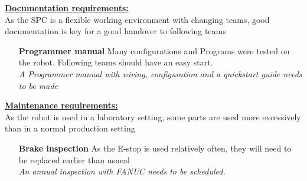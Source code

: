 %
\underline{\textbf{Documentation requirements:}}\vspace{2mm}\\
As the SPC is a flexible working environment with changing teams, good documentation is key for a good handover to following teams\\
\begin{itemize}[leftmargin=5cm]
	\item[\textbf{Programmer manual}] Many configurations and Programs were tested on the robot. Following teams should have an easy start.\\
	\textit{A Programmer manual with wiring, configuration and a quickstart guide needs to be made} 
\end{itemize}
%
\underline{\textbf{Maintenance requirements:}}\vspace{2mm}\\
As the robot is used in a laboratory setting, some parts are used more excessively than in a normal production setting\\
\begin{itemize}[leftmargin=5cm]
	\item[\textbf{Brake inspection}] As the E-stop is used relatively often, they will need to be replaced earlier than usueal\\
	\textit{An annual inspection with FANUC needs to be scheduled.}
\end{itemize}
%




